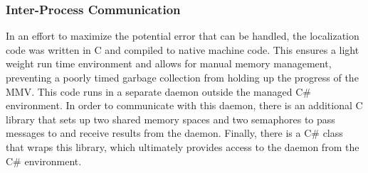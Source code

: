 \subsubsection{Inter-Process Communication}
In an effort to maximize the potential error that can be handled, the localization code was written in C and compiled to native machine code.  This ensures a light weight run time environment and allows for manual memory management, preventing a poorly timed garbage collection from holding up the progress of the MMV.  This code runs in a separate daemon outside the managed C\# environment.  In order to communicate with this daemon, there is an additional C library that sets up two shared memory spaces and two semaphores to pass messages to and receive results from the daemon.  Finally, there is a C\# class that wraps this library, which ultimately provides access to the daemon from the C\# environment.
